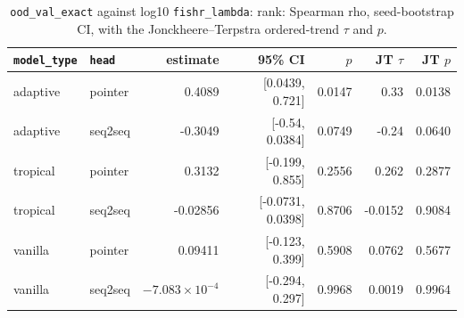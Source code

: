 \documentclass[10pt]{article}
\begin{document}
{\small
\begin{longtable}{llrrrrr}
\caption{\texttt{ood\_val\_exact} against log10 \texttt{fishr\_lambda}: rank: Spearman rho, seed-bootstrap CI, with the Jonckheere--Terpstra ordered-trend $\tau$ and $p$.}\label{tab:trend-ood_val_exact}\\
\toprule
\texttt{model\_type} & \texttt{head} & estimate & 95\% CI & $p$ & JT $\tau$ & JT $p$\\
\midrule
\endhead
adaptive & pointer & 0.4089 & [0.0439, 0.721] & 0.0147 & 0.33 & 0.0138\\
adaptive & seq2seq & -0.3049 & [-0.54, 0.0384] & 0.0749 & -0.24 & 0.0640\\
tropical & pointer & 0.3132 & [-0.199, 0.855] & 0.2556 & 0.262 & 0.2877\\
tropical & seq2seq & -0.02856 & [-0.0731, 0.0398] & 0.8706 & -0.0152 & 0.9084\\
vanilla & pointer & 0.09411 & [-0.123, 0.399] & 0.5908 & 0.0762 & 0.5677\\
vanilla & seq2seq & $-7.083\times10^{-4}$ & [-0.294, 0.297] & 0.9968 & 0.0019 & 0.9964\\
\bottomrule
\end{longtable}
}
\end{document}
